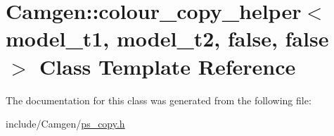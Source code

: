 \hypertarget{a00070}{}\section{Camgen\+:\+:colour\+\_\+copy\+\_\+helper$<$ model\+\_\+t1, model\+\_\+t2, false, false $>$ Class Template Reference}
\label{a00070}


The documentation for this class was generated from the following file\+:\begin{DoxyCompactItemize}
\item 
include/\+Camgen/\hyperlink{a00740}{ps\+\_\+copy.\+h}\end{DoxyCompactItemize}
